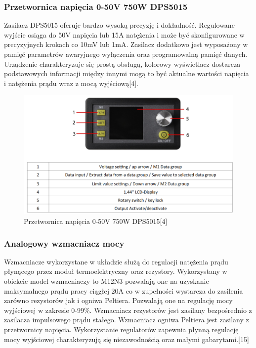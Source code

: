 \documentclass[oneside]{mgr}
\begin{document}
\subsubsection{Przetwornica napięcia 0-50V 750W DPS5015}

Zasilacz DPS5015 oferuje bardzo wysoką precyzję i dokładność. Regulowane wyjście osiąga do 50V napięcia lub 15A natężenia i może być skonfigurowane w precyzyjnych krokach co 10mV lub 1mA. Zasilacz dodatkowo jest wyposażony w pamięć parametrów awaryjnego wyłączenia oraz programowalną pamięć danych. Urządzenie charakteryzuje się prostą obsługą, kolorowy wyświetlacz dostarcza podstawowych informacji między innymi mogą to być aktualne wartości napięcia i natężenia prądu wraz z mocą wyjściową[4].

\begin{figure}
    \centering
    \includegraphics[width=\textwidth]{Przetwornica_napiecia.PNG}
    \caption{Przetwornica napięcia 0-50V 750W DPS5015[4]}
\end{figure}

\subsubsection{Analogowy wzmacniacz mocy}
Wzmacniacze wykorzystane w układzie służą do regulacji natężenia prądu płynącego przez moduł termoelektryczny oraz rezystory. Wykorzystany w obiekcie model wzmacniaczy to M12N3 pozwalają one na uzyskanie maksymalnego prądu pracy ciągłej 20A co w zupełności wystarcza do zasilenia zarówno rezystorów jak i ogniwa Peltiera. Pozwalają one na regulację mocy wyjściowej w zakresie 0-99\%. Wzmacniacz rezystorów jest zasilany bezpośrednio z zasilacza impulsowego prądu stałego. Wzmacniacz ogniwa Peltiera jest zasilany z przetwornicy napięcia. Wykorzystanie regulatorów zapewnia płynną regulację mocy wyjściowej charakteryzują się niezawodnością oraz małymi gabarytami.[15]
\end{document}
